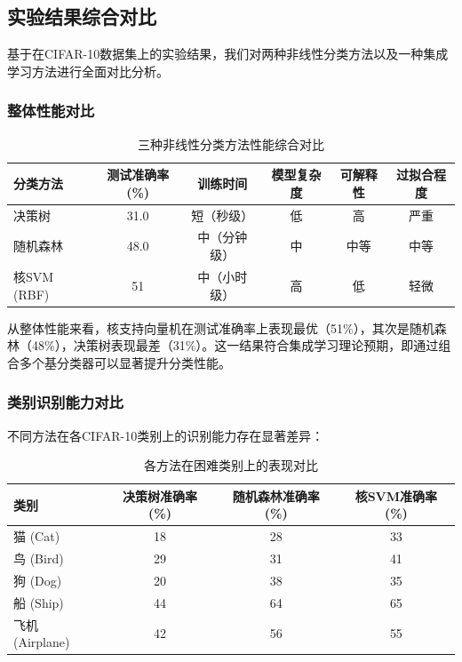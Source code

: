 \documentclass[UTF8]{report}
\theoremstyle{MyLineTheoremStyle} %
\theoremstyle{MyBlockTheoremStyle} %
\theoremstyle{MySubsubsectionStyle} %
\begin{document}
\subsection{实验结果综合对比}

基于在CIFAR-10数据集上的实验结果，我们对两种非线性分类方法以及一种集成学习方法进行全面对比分析。

\subsubsection{整体性能对比}

\begin{table}[h]
\centering
\caption{三种非线性分类方法性能综合对比}
\begin{tabular}{l c c c c c}
\toprule
\textbf{分类方法} & \textbf{测试准确率(\%)} & \textbf{训练时间} & \textbf{模型复杂度} & \textbf{可解释性} & \textbf{过拟合程度} \\
\midrule
决策树 & 31.0 & 短（秒级） & 低 & 高 & 严重 \\
随机森林 & 48.0 & 中（分钟级） & 中 & 中等 & 中等 \\
核SVM (RBF) & 51 & 中（小时级） & 高 & 低 & 轻微 \\
\bottomrule
\end{tabular}
\end{table}

从整体性能来看，核支持向量机在测试准确率上表现最优（51\%），其次是随机森林（48\%），决策树表现最差（31\%）。这一结果符合集成学习理论预期，即通过组合多个基分类器可以显著提升分类性能。

\subsubsection{类别识别能力对比}

不同方法在各CIFAR-10类别上的识别能力存在显著差异：

\begin{table}[h]
\centering
\caption{各方法在困难类别上的表现对比}
\begin{tabular}{l c c c}
\toprule
\textbf{类别} & \textbf{决策树准确率(\%)} & \textbf{随机森林准确率(\%)} & \textbf{核SVM准确率(\%)} \\
\midrule
猫 (Cat) & 18 & 28 & 33 \\
鸟 (Bird) & 29 & 31 & 41 \\
狗 (Dog) & 20 & 38 & 35 \\
船 (Ship) & 44 & 64 & 65 \\
飞机 (Airplane) & 42 & 56 & 55 \\
\bottomrule
\end{tabular}
\end{table}
\end{document}
